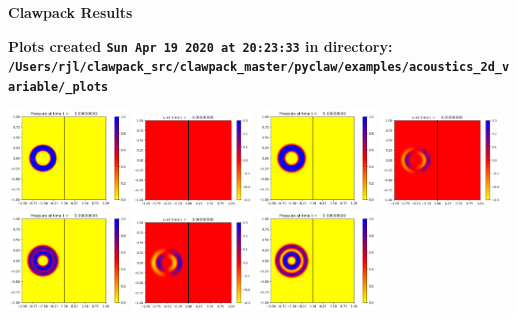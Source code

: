 \documentclass[11pt]{article}
\begin{document}
        \begin{center}{\Large\bf Clawpack Results}\vskip 5pt
        
        \bf Plots created {\tt Sun Apr 19 2020 at 20:23:33} in directory: \vskip 5pt
        \verb+/Users/rjl/clawpack_src/clawpack_master/pyclaw/examples/acoustics_2d_variable/_plots+
        \end{center}
        \vskip 5pt
        \includegraphics[width=0.2375\textwidth]{frame0000fig0.png}
\includegraphics[width=0.2375\textwidth]{frame0000fig1.png}
\includegraphics[width=0.2375\textwidth]{frame0001fig0.png}
\includegraphics[width=0.2375\textwidth]{frame0001fig1.png}
\vskip 10pt 
\includegraphics[width=0.2375\textwidth]{frame0002fig0.png}
\includegraphics[width=0.2375\textwidth]{frame0002fig1.png}
\includegraphics[width=0.2375\textwidth]{frame0003fig0.png}
\end{document}
